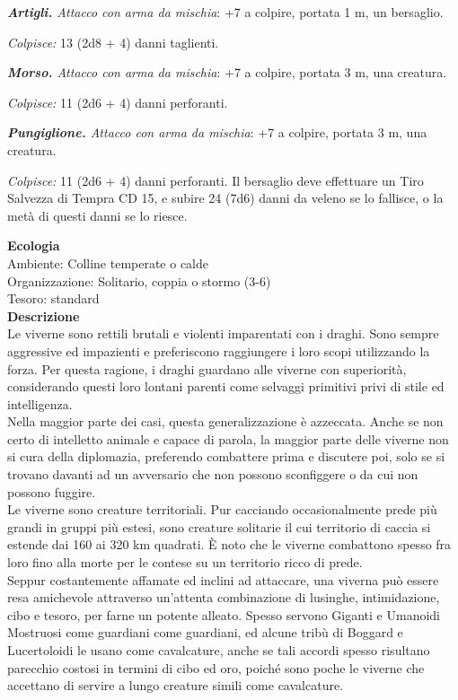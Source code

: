 \begin{multicols}{2}
\emph{\textbf{Artigli.} Attacco con arma da mischia}: +7 a colpire, portata 1 m, un bersaglio.

\emph{Colpisce:} 13 (2d8 + 4) danni taglienti.

\emph{\textbf{Morso.} Attacco con arma da mischia}: +7 a colpire, portata 3 m, una creatura.

\emph{Colpisce:} 11 (2d6 + 4) danni perforanti.

\emph{\textbf{Pungiglione.} Attacco con arma da mischia}: +7 a colpire, portata 3 m, una creatura.

\emph{Colpisce:} 11 (2d6 + 4) danni perforanti. Il bersaglio deve effettuare un Tiro Salvezza di Tempra CD 15, e subire 24 (7d6) danni da veleno se lo fallisce, o la metà di questi danni se lo riesce.

\textbf{Ecologia}\\
Ambiente: Colline temperate o calde\\
Organizzazione: Solitario, coppia o stormo (3-6)\\
Tesoro: standard\\
\textbf{Descrizione}\\
Le viverne sono rettili brutali e violenti imparentati con i draghi. Sono sempre aggressive ed impazienti e preferiscono raggiungere i loro scopi utilizzando la forza. Per questa ragione, i draghi guardano alle viverne con superiorità, considerando questi loro lontani parenti come selvaggi primitivi privi di stile ed intelligenza.\\

Nella maggior parte dei casi, questa generalizzazione è azzeccata. Anche se non certo di intelletto animale e capace di parola, la maggior parte delle viverne non si cura della diplomazia, preferendo combattere prima e discutere poi, solo se si trovano davanti ad un avversario che non possono sconfiggere o da cui non possono fuggire.\\

Le viverne sono creature territoriali. Pur cacciando occasionalmente prede più grandi in gruppi più estesi, sono creature solitarie il cui territorio di caccia si estende dai 160 ai 320 km quadrati. È noto che le viverne combattono spesso fra loro fino alla morte per le contese su un territorio ricco di prede.\\


Seppur costantemente affamate ed inclini ad attaccare, una viverna può essere resa amichevole attraverso un'attenta combinazione di lusinghe, intimidazione, cibo e tesoro, per farne un potente alleato. Spesso servono Giganti e Umanoidi Mostruosi come guardiani come guardiani, ed alcune tribù di Boggard e Lucertoloidi le usano come cavalcature, anche se tali accordi spesso risultano parecchio costosi in termini di cibo ed oro, poiché sono poche le viverne che accettano di servire a lungo creature simili come cavalcature.\\


\end{multicols}

